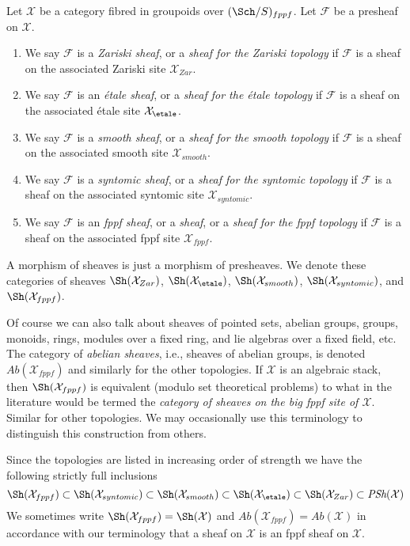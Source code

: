 \begin{definition}
\label{definition-sheaves}
Let $\mathcal{X}$ be a category fibred in groupoids over
$(\Sch/S)_{fppf}$. Let $\mathcal{F}$ be a presheaf on $\mathcal{X}$.
\begin{enumerate}
\item We say $\mathcal{F}$ is a {\it Zariski sheaf}, or a
{\it sheaf for the Zariski topology} if $\mathcal{F}$
is a sheaf on the associated Zariski site $\mathcal{X}_{Zar}$.
\item We say $\mathcal{F}$ is an {\it \'etale sheaf}, or a
{\it sheaf for the \'etale topology} if $\mathcal{F}$
is a sheaf on the associated \'etale site $\mathcal{X}_\etale$.
\item We say $\mathcal{F}$ is a {\it smooth sheaf}, or a
{\it sheaf for the smooth topology} if $\mathcal{F}$
is a sheaf on the associated smooth site $\mathcal{X}_{smooth}$.
\item We say $\mathcal{F}$ is a {\it syntomic sheaf}, or a
{\it sheaf for the syntomic topology} if $\mathcal{F}$
is a sheaf on the associated syntomic site $\mathcal{X}_{syntomic}$.
\item We say $\mathcal{F}$ is an {\it fppf sheaf}, or a {\it sheaf},
or a {\it sheaf for the fppf topology} if $\mathcal{F}$
is a sheaf on the associated fppf site $\mathcal{X}_{fppf}$.
\end{enumerate}
A morphism of sheaves is just a morphism of presheaves. We denote
these categories of sheaves
$\Sh(\mathcal{X}_{Zar})$,
$\Sh(\mathcal{X}_\etale)$,
$\Sh(\mathcal{X}_{smooth})$,
$\Sh(\mathcal{X}_{syntomic})$, and
$\Sh(\mathcal{X}_{fppf})$.
\end{definition}

\noindent
Of course we can also talk about sheaves of pointed sets, abelian groups,
groups, monoids, rings, modules over a fixed ring, and lie algebras over
a fixed field, etc. The category of {\it abelian sheaves}, i.e., sheaves
of abelian groups, is denoted $\textit{Ab}(\mathcal{X}_{fppf})$
and similarly for the other topologies. If $\mathcal{X}$ is an algebraic
stack, then $\Sh(\mathcal{X}_{fppf})$ is equivalent (modulo
set theoretical problems) to what in the literature would be termed
the {\it category of sheaves on the big fppf site of $\mathcal{X}$}. Similar
for other topologies. We may occasionally use this terminology to
distinguish this construction from others.

\medskip\noindent
Since the topologies are listed in increasing order of strength we have
the following strictly full inclusions
$$
\Sh(\mathcal{X}_{fppf}) \subset
\Sh(\mathcal{X}_{syntomic}) \subset
\Sh(\mathcal{X}_{smooth}) \subset
\Sh(\mathcal{X}_\etale) \subset
\Sh(\mathcal{X}_{Zar}) \subset \textit{PSh}(\mathcal{X})
$$
We sometimes write
$\Sh(\mathcal{X}_{fppf}) = \Sh(\mathcal{X})$
and
$\textit{Ab}(\mathcal{X}_{fppf}) = \textit{Ab}(\mathcal{X})$
in accordance with our terminology that a sheaf on $\mathcal{X}$
is an fppf sheaf on $\mathcal{X}$.

